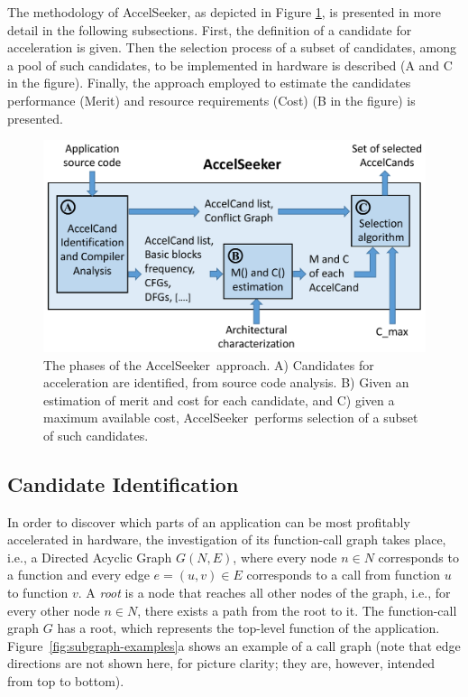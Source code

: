 \documentclass[]{usiinfthesis}
\newcommand{\aseeker}{{AccelSeeker}}
\begin{document}

The methodology of \aseeker, as depicted in Figure \ref{fig:flow}, is presented in 
more detail in the following subsections.  
First, the definition of a candidate for acceleration is given. Then the selection 
process of a subset of candidates, among a pool of such candidates, to be implemented in 
hardware is described (A and C in the figure). Finally, the approach employed to estimate 
the candidates performance (Merit) and resource requirements (Cost) (B in the figure) is presented.

\begin{figure}[!t]
  \centering
  \includegraphics[width= 0.7\linewidth]{figs/flow.pdf}
  \caption{The phases of the \aseeker\ approach. A) Candidates
          for acceleration are identified, from source code
          analysis. B) Given an estimation of merit and cost for each
          candidate, and C) given a maximum available cost, \aseeker\
          performs selection of a subset of such candidates.}
  \label{fig:flow}
\end{figure}

\subsection{Candidate Identification}
\label{subsec:identification}

In order to discover which parts of an application can be most
profitably accelerated in hardware, the investigation of its function-call
graph takes place, i.e., a Directed Acyclic Graph $G(N,E)$, where every node $n
\in N$ corresponds to a function and every edge $e=(u,v) \in E$
corresponds to a call from function $u$ to function $v$. A \emph{root}
is a node that reaches all other nodes of the graph, i.e., for every
other node $n \in N$, there exists a path from the root to it. The
function-call graph $G$ has a root, which represents the top-level
function of the application. Figure~\ref{fig:subgraph-examples}a shows
an example of a call graph (note that edge directions are not shown
here, for picture clarity; they are, however, intended from
top to bottom).
\end{document}
